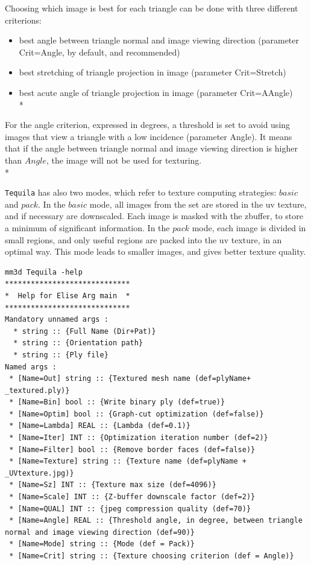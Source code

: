 Choosing which image is best for each triangle can be done with three different criterions:
\begin{itemize}
\item   best angle between triangle normal and image viewing direction (parameter Crit=Angle, by default, and recommended)
\item   best stretching of triangle projection in image (parameter Crit=Stretch)
\item   best acute angle of triangle projection in image (parameter Crit=AAngle)\\*
\end{itemize}

For the angle criterion, expressed in degrees, a threshold is set to avoid using images that view a triangle with a low incidence (parameter Angle).
It means that if the angle between triangle normal and image viewing direction is higher than $Angle$, the image will not be used for texturing.\\*

{\tt Tequila} has also two modes, which refer to texture computing strategies: $basic$ and $pack$. In the $basic$ mode, all images from the set are stored in the uv texture, and if necessary are downscaled. Each image is masked with the zbuffer, to store a minimum of significant information.
In the $pack$ mode, each image is divided in small regions, and only useful regions are packed into the uv texture, in an optimal way. This mode leads to smaller images, and gives better texture quality.

\begin{verbatim}
mm3d Tequila -help
*****************************
*  Help for Elise Arg main  *
*****************************
Mandatory unnamed args :
  * string :: {Full Name (Dir+Pat)}
  * string :: {Orientation path}
  * string :: {Ply file}
Named args :
 * [Name=Out] string :: {Textured mesh name (def=plyName+ _textured.ply)}
 * [Name=Bin] bool :: {Write binary ply (def=true)}
 * [Name=Optim] bool :: {Graph-cut optimization (def=false)}
 * [Name=Lambda] REAL :: {Lambda (def=0.1)}
 * [Name=Iter] INT :: {Optimization iteration number (def=2)}
 * [Name=Filter] bool :: {Remove border faces (def=false)}
 * [Name=Texture] string :: {Texture name (def=plyName + _UVtexture.jpg)}
 * [Name=Sz] INT :: {Texture max size (def=4096)}
 * [Name=Scale] INT :: {Z-buffer downscale factor (def=2)}
 * [Name=QUAL] INT :: {jpeg compression quality (def=70)}
 * [Name=Angle] REAL :: {Threshold angle, in degree, between triangle normal and image viewing direction (def=90)}
 * [Name=Mode] string :: {Mode (def = Pack)}
 * [Name=Crit] string :: {Texture choosing criterion (def = Angle)}
\end{verbatim}

